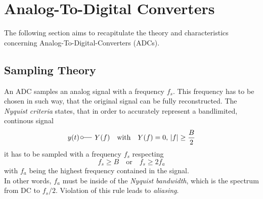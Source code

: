 \newpage


\section{Analog-To-Digital Converters}
The following section aims to recapitulate the theory and characteristics concerning Analog-To-Digital-Converters (ADCs).
\subsection{Sampling Theory}
An ADC samples an analog signal with a frequency $f_s$. This frequency has to be chosen in such way, that the original signal can be fully reconstructed. The \textit{Nyquist criteria} states, that in order to accurately represent a bandlimited, continous signal
\begin{equation}
	y (t) \, \fourier  Y(f) \quad \text{with} \quad Y(f) = 0, \, |f| \geq \frac{B}{2}
\end{equation}
it has to be sampled with a frequency $f_s$ respecting
\begin{equation}
	f_s \geq B \quad \text{or} \quad f_s \geq 2 f_a
\end{equation}
with $f_a$ being the highest frequency contained in the signal. \cite{walt} \cite{puente2015} \\
In other words, $f_a$ must be inside of the \textit{Nyquist bandwidth}, which is the spectrum from DC to $f_s/2$. Violation of this rule leads to \textit{aliasing}.

